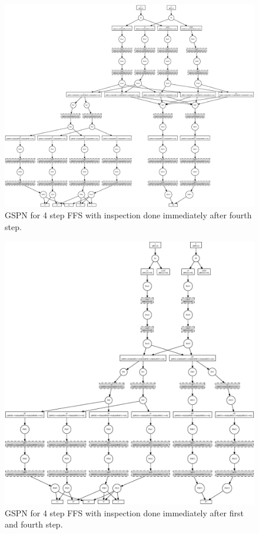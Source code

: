 \begin{figure}[p]
\begin{center}
	\includegraphics[width=\hsize]{fig/4a.eps}
\end{center}
\caption{GSPN for 4 step FFS with inspection done immediately after fourth step.}
\label{fig:ffs4}
\end{figure}

\begin{figure}[p]
\begin{center}
	\includegraphics[width=\hsize]{fig/1a-4a.eps}
\end{center}
\caption{GSPN for 4 step FFS with inspection done immediately after first and fourth step.}
\label{fig:ffs14}
\end{figure}

